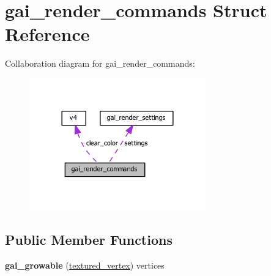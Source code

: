 \hypertarget{structgai__render__commands}{}\section{gai\+\_\+render\+\_\+commands Struct Reference}
\label{structgai__render__commands}


Collaboration diagram for gai\+\_\+render\+\_\+commands\+:\nopagebreak
\begin{figure}[H]
\begin{center}
\leavevmode
\includegraphics[width=216pt]{structgai__render__commands__coll__graph}
\end{center}
\end{figure}
\subsection*{Public Member Functions}
\begin{DoxyCompactItemize}
\item 
\mbox{\label{structgai__render__commands_a3e2bcf7118cbc84c5615486ac1f8b221}} 
{\bfseries gai\+\_\+growable} (\hyperlink{structtextured__vertex}{textured\+\_\+vertex}) vertices
\end{DoxyCompactItemize}
